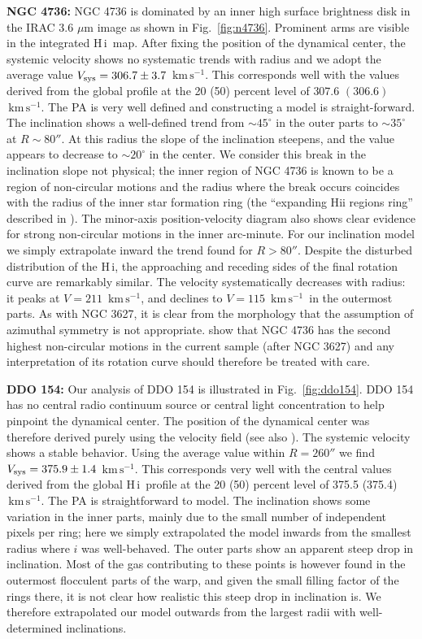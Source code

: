 \documentclass[usenatbib,usegraphicx,apjfonts,floatfix]{emulateapj}
\newcommand{\kms}{\ensuremath{\,\mbox{km}\,\mbox{s}^{-1}}}
\newcommand{\HI}{H\,{\sc i}}
\begin{document}
{\bf NGC 4736:} NGC 4736 is dominated by an inner high surface
brightness disk in the IRAC 3.6 $\mu$m image as shown in
Fig.~\ref{fig:n4736}. Prominent arms are visible in the integrated
\HI\ map.  After fixing the position of the dynamical center, the
systemic velocity shows no systematic trends with radius and we adopt
the average value $V_{\rm sys} = 306.7 \pm 3.7$ \kms. This corresponds
well with the values derived from the global profile at the 20 (50)
percent level of $307.6$ $(306.6)$ \kms.
The PA is very well defined and constructing a model is
straight-forward.  The inclination shows a well-defined trend from
$\sim 45^{\circ}$ in the outer parts to $\sim 35^{\circ}$ at $R\sim
80''$. At this radius the slope of the inclination steepens, and the
value appears to decrease to $\sim 20^{\circ}$ in the center.  We
consider this break in the inclination slope not physical; the inner
region of NGC 4736 is known to be a region of non-circular motions and
the radius where the break occurs coincides with the radius of the
inner star formation ring (the ``expanding H{\sc ii} regions ring''
described in \citealt{munoz}). The minor-axis position-velocity
diagram also shows clear evidence for strong non-circular motions in
the inner arc-minute.  For our inclination model we simply extrapolate
inward the trend found for $R>80''$.
Despite the disturbed distribution of the \HI, the approaching and
receding sides of the final rotation curve are remarkably similar. The
velocity systematically decreases with radius: it peaks at $V
= 211$ \kms, and declines to $V=115$ \kms\ in the outermost parts.  As
with NGC 3627, it is clear from the morphology that the assumption of
azimuthal symmetry is not appropriate. \citet{clemens2007} show
that NGC 4736 has the second highest non-circular motions in the
current sample (after NGC 3627) and any interpretation of its rotation
curve should therefore be treated with care.

{\bf DDO 154:} Our analysis of DDO 154 is illustrated in
Fig.~\ref{fig:ddo154}.  DDO 154 has no central radio continuum source
or central light concentration to help pinpoint the dynamical center.
The position of the dynamical center was therefore derived purely
using the velocity field (see also \citealt{clemens2007}).  The
systemic velocity shows a stable behavior. Using the average value
within $R=260''$ we find $V_{\rm sys} = 375.9 \pm 1.4$ \kms.  This
corresponds very well with the central values derived from the global
\HI\ profile at the 20 (50) percent level of 375.5 (375.4) \kms.
The PA is straightforward to model. The inclination shows some
variation in the inner parts, mainly due to the small number of
independent pixels per ring; here we simply extrapolated the model
inwards from the smallest radius where $i$ was well-behaved. The outer
parts show an apparent steep drop in inclination. Most of the gas
contributing to these points is however found in the outermost
flocculent parts of the warp, and given the small filling factor of
the rings there, it is not clear how realistic this steep drop in
inclination is.  We therefore extrapolated our model outwards from the
largest radii with well-determined inclinations.
\end{document}

